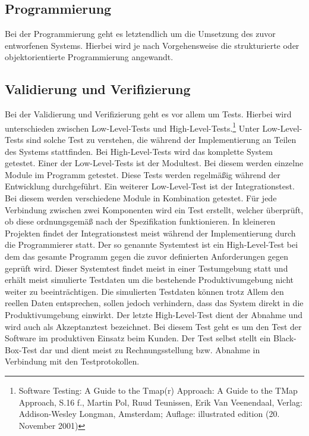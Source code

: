 \subsection{Programmierung}

Bei der Programmierung geht es letztendlich um die Umsetzung des zuvor entworfenen Systems. Hierbei wird je nach Vorgehensweise die strukturierte oder objektorientierte Programmierung angewandt.

\subsection{Validierung und Verifizierung}

Bei der Validierung  und Verifizierung geht es vor allem um Tests. Hierbei wird unterschieden zwischen Low-Level-Tests und High-Level-Tests.\footnote{Software Testing: A Guide to the Tmap(r) Approach: A Guide to the TMap Approach, S.16 f., Martin Pol, Ruud Teunissen, Erik Van Veenendaal, Verlag: Addison-Wesley Longman, Amsterdam; Auflage: illustrated edition (20. November 2001)}
Unter Low-Level-Tests sind solche Test zu verstehen, die während der Implementierung an Teilen des Systems stattfinden. Bei High-Level-Tests wird das komplette System getestet. Einer der Low-Level-Tests ist der Modultest. Bei diesem werden einzelne Module im Programm getestet.  Diese Tests werden regelmäßig während der Entwicklung durchgeführt. Ein weiterer Low-Level-Test ist der Integrationstest. Bei diesem werden verschiedene Module in Kombination getestet. Für jede Verbindung zwischen zwei Komponenten wird ein Test erstellt, welcher überprüft, ob diese ordnungsgemäß nach der Spezifikation funktionieren. In kleineren Projekten findet der Integrationstest meist während der Implementierung durch die Programmierer statt.
Der so genannte Systemtest ist ein High-Level-Test bei dem das gesamte Programm gegen die zuvor definierten Anforderungen gegen geprüft wird. Dieser Systemtest findet meist in einer Testumgebung statt und erhält meist simulierte Testdaten um die bestehende Produktivumgebung nicht weiter zu beeinträchtigen. Die simulierten Testdaten können trotz Allem den reellen Daten entsprechen, sollen jedoch verhindern, dass das System direkt in die Produktivumgebung einwirkt.
Der letzte High-Level-Test dient der Abnahme und wird auch als Akzeptanztest bezeichnet. Bei diesem Test geht es um den Test der Software im produktiven Einsatz beim Kunden. Der Test selbst stellt ein Black-Box-Test dar und dient meist zu Rechnungsstellung bzw. Abnahme in Verbindung mit den Testprotokollen.

